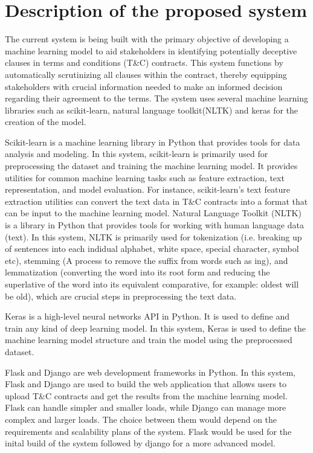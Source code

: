 \section{Description of the proposed system \label{Section::Description of the proposed System proposed}}
The current system is being built with the primary objective of developing a machine learning model to aid stakeholders in identifying potentially deceptive clauses in terms and conditions (T\&C) contracts. This system functions by automatically scrutinizing all clauses within the contract, thereby equipping stakeholders with crucial information needed to make an informed decision regarding their agreement to the terms.
The system uses several machine learning libraries such as scikit-learn, natural language toolkit(NLTK) and keras for the creation of the model. 

Scikit-learn is a machine learning library in Python that provides tools for data analysis and modeling. In this system, scikit-learn is primarily used for preprocessing the dataset and training the machine learning model. It provides utilities for common machine learning tasks such as feature extraction, text representation, and model evaluation. For instance, scikit-learn's text feature extraction utilities can convert the text data in T&C contracts into a format that can be input to the machine learning model.
Natural Language Toolkit (NLTK) is a library in Python that provides tools for working with human language data (text).  In this system, NLTK is primarily used for tokenization (i.e. breaking up of sentences into each indidual alphabet, white space, special character, symbol etc), stemming (A process to remove the suffix from words such as ing), and lemmatization (converting the word into its root form and reducing the superlative of the word into its equivalent comparative, for example: oldest will be old), which are crucial steps in preprocessing the text data.

Keras is a high-level neural networks API in Python.  
It is used to define and train any kind of deep learning model. In this system, Keras is used to define the machine learning model structure and train the model using the preprocessed dataset.

Flask and Django are web development frameworks in Python.  In this system, Flask and Django are used to build the web application that allows users to upload T&C contracts and get the results from the machine learning model. Flask can handle simpler and smaller loads, while Django can manage more complex and larger loads. The choice between them would depend on the requirements and scalability plans of the system. Flask would be used for the inital build of the system followed by django for a more advanced model. 

